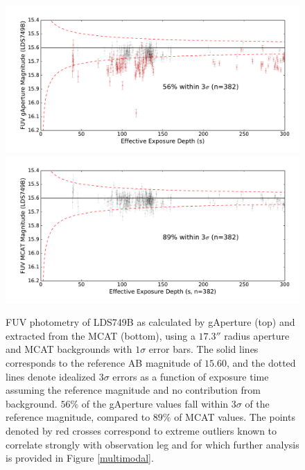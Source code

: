 \documentclass[iop]{emulateapj}
\begin{document}
\begin{figure}[h!]
\includegraphics[scale=0.3]{Fig07a.pdf}\\
\includegraphics[scale=0.3]{Fig07b.pdf}
\caption{FUV photometry of LDS749B as calculated by gAperture (top) and extracted from the MCAT (bottom), using a $17.3''$ radius aperture and MCAT backgrounds with $1\sigma$ error bars. The solid lines corresponds to the reference AB magnitude of $15.60$, and the dotted lines denote idealized $3\sigma$ errors as a function of exposure time assuming the reference magnitude and no contribution from background. $56\%$ of the gAperture values fall within $3\sigma$ of the reference magnitude, compared to $89\%$ of MCAT values. The points denoted by red crosses correspond to extreme outliers known to correlate strongly with observation leg and for which further analysis is provided in Figure \ref{multimodal}.
\label{ldsabsphotfuv}}
\end{figure}
\end{document}
